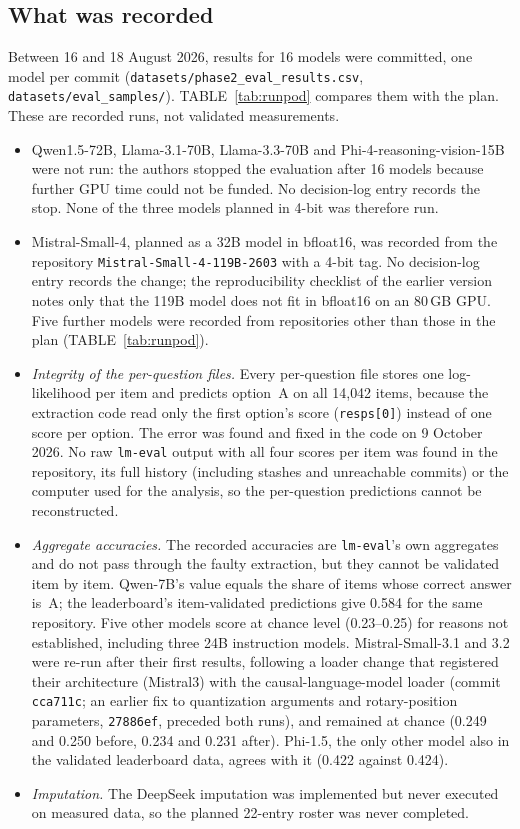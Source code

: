 \documentclass[10pt]{article}
\begin{document}
\subsection*{What was recorded}
Between 16 and 18 August 2026, results for 16 models were committed, one model per commit (\texttt{datasets/phase2\_eval\_results.csv}, \texttt{datasets/eval\_samples/}). TABLE~\ref{tab:runpod} compares them with the plan. These are recorded runs, not validated measurements.
\begin{itemize}
\item Qwen1.5-72B, Llama-3.1-70B, Llama-3.3-70B and Phi-4-reasoning-vision-15B were not run: the authors stopped the evaluation after 16 models because further GPU time could not be funded. No decision-log entry records the stop. None of the three models planned in 4-bit was therefore run.
\item Mistral-Small-4, planned as a 32B model in bfloat16, was recorded from the repository \texttt{Mistral-Small-4-119B-2603} with a 4-bit tag. No decision-log entry records the change; the reproducibility checklist of the earlier version notes only that the 119B model does not fit in bfloat16 on an 80\,GB GPU. Five further models were recorded from repositories other than those in the plan (TABLE~\ref{tab:runpod}).
\item \emph{Integrity of the per-question files.} Every per-question file stores one log-likelihood per item and predicts option~A on all 14{,}042 items, because the extraction code read only the first option's score (\texttt{resps[0]}) instead of one score per option. The error was found and fixed in the code on 9 October 2026. No raw \texttt{lm-eval} output with all four scores per item was found in the repository, its full history (including stashes and unreachable commits) or the computer used for the analysis, so the per-question predictions cannot be reconstructed.
\item \emph{Aggregate accuracies.} The recorded accuracies are \texttt{lm-eval}'s own aggregates and do not pass through the faulty extraction, but they cannot be validated item by item. Qwen-7B's value equals the share of items whose correct answer is~A; the leaderboard's item-validated predictions give 0.584 for the same repository. Five other models score at chance level (0.23--0.25) for reasons not established, including three 24B instruction models. Mistral-Small-3.1 and 3.2 were re-run after their first results, following a loader change that registered their architecture (Mistral3) with the causal-language-model loader (commit \texttt{cca711c}; an earlier fix to quantization arguments and rotary-position parameters, \texttt{27886ef}, preceded both runs), and remained at chance (0.249 and 0.250 before, 0.234 and 0.231 after). Phi-1.5, the only other model also in the validated leaderboard data, agrees with it (0.422 against 0.424).
\item \emph{Imputation.} The DeepSeek imputation was implemented but never executed on measured data, so the planned 22-entry roster was never completed.
\end{itemize}
\end{document}
